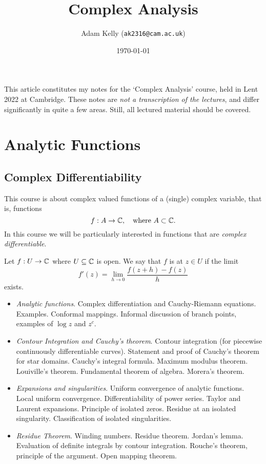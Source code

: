 \documentclass[a4paper]{article}
\title{Complex Analysis}
\author{Adam Kelly (\texttt{ak2316@cam.ac.uk})}
\date{\today}
\begin{document}
\maketitle


This article constitutes my notes for the `Complex Analysis' course, held in Lent 2022 at Cambridge. These notes are \emph{not a transcription of the lectures}, and differ significantly in quite a few areas. 
Still, all lectured material should be covered.

\section{Analytic Functions}

\subsection{Complex Differentiability}

This course is about complex valued functions of a (single) complex variable, that is, functions
$$
f: A \rightarrow \mathbb{C}, \quad \text{where } A \subset \mathbb{C}.
$$
In this course we will be particularly interested in functions that are \emph{complex differentiable}.

\begin{definition}
    Let $f: U \rightarrow \mathbb{C}$ where $U \subseteq \mathbb{C}$ is open. We say that $f$ is  at $z \in U$ if the limit
    $$
    f'(z) = \lim_{h \rightarrow 0} \frac{f(z + h) - f(z)}{h}
    $$
    exists.
\end{definition}


\begin{itemize}
    \item \emph{Analytic functions}. Complex differentiation and Cauchy-Riemann equations. Examples. Conformal mappings. Informal discussion of branch points, examples of $\log z$ and $z^c$.
    \item \emph{Contour Integration and Cauchy's theorem}. Contour integration (for piecewise continuously differentiable curves). Statement and proof of Cauchy's theorem for star domains. Cauchy's integral formula. Maximum modulus theorem. Louiville's theorem. Fundamental theorem of algebra. Morera's theorem.
    \item \emph{Expansions and singularities}. Uniform convergence of analytic functions. Local uniform convergence. Differentiability of power series. Taylor and Laurent expansions. Principle of isolated zeros. Residue at an isolated singularity. Classification of isolated singularities.
    \item \emph{Residue Theorem}. Winding numbers. Residue theorem. Jordan's lemma. Evaluation of definite integrals by contour integration. Rouche's theorem, principle of the argument. Open mapping theorem.
\end{itemize}
\end{document}
